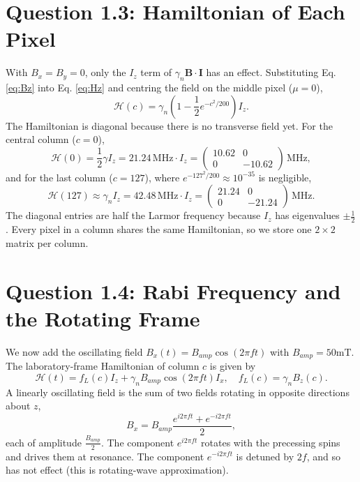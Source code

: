 \documentclass{article}
\newcommand{\MHz}{\,\mathrm{MHz}}
\begin{document}
\section{Question 1.3: Hamiltonian of Each Pixel}
With $B_x=B_y=0$, only the $I_z$ term of $\gamma _n\mathbf{B}\cdot\mathbf{I}$ has an effect. Substituting Eq. \eqref{eq:Bz} into Eq. \eqref{eq:Hz} and centring the field on the middle pixel ($\mu =0$),
\begin{equation}
    \mathcal{H}(c)=\gamma _n \left( 1-\frac{1}{2}e^{-c^2/200} \right)I_z.
\end{equation}
The Hamiltonian is diagonal because there is no transverse field yet. For the central column ($c=0$),
\begin{equation}
    \mathcal{H}(0)=\frac{1}{2}\gamma I_z=21.24\MHz \cdot I_z=\begin{pmatrix}
        10.62&0\\0&-10.62
    \end{pmatrix}\MHz,
\end{equation}
and for the last column ($c=127$), where $e^{-127^2/200}\approx 10^{-35}$ is negligible,
\begin{equation}
    \mathcal{H}(127)\approx\gamma _nI_z=42.48\MHz \cdot I_z=\begin{pmatrix}
        21.24&0\\0&-21.24
    \end{pmatrix}\MHz.
\end{equation}
The diagonal entries are half the Larmor frequency because $I_z$ has eigenvalues $\pm \frac{1}{2}$. Every pixel in a column shares the same Hamiltonian, so we store one $2\times  2$ matrix per column.

\section{Question 1.4: Rabi Frequency and the Rotating Frame}
We now add the oscillating field $B_x(t)=B_{amp}\cos(2\pi ft)$ with $B_{amp}=50 \text{mT}$. The laboratory-frame Hamiltonian of column $c$ is given by
\begin{equation}
    \mathcal{H}(t)=f_L(c) I_z+\gamma _nB_{amp}\cos(2\pi ft)I_x,\quad f_L(c)=\gamma _nB_z(c).
\end{equation}
A linearly oscillating field is the sum of two fields rotating in opposite directions about $z$,
\begin{equation}
    B_x=B_{amp} \frac{e^{i 2\pi ft}+e^{-i 2\pi ft}}{2},
\end{equation}
each of amplitude $\frac{B_{amp}}{2}$. The component $e^{i 2\pi ft}$ rotates with the precessing spins and drives them at resonance. The component $e^{-i 2\pi ft}$ is detuned by $2f$, and so has not effect (this is rotating-wave approximation).
\end{document}
